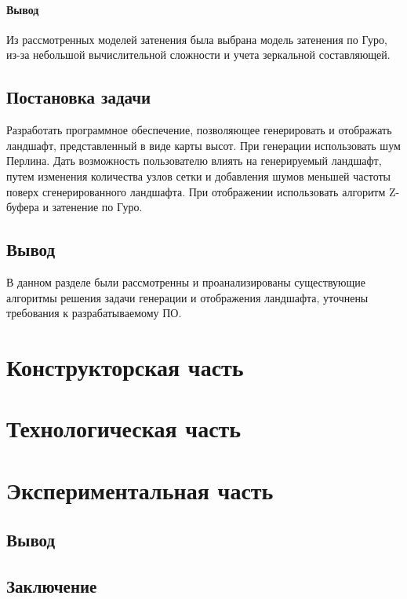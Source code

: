 \documentclass{article}
\begin{document}
	\paragraph{Вывод}
	\indent Из рассмотренных моделей затенения была выбрана модель затенения по Гуро, из-за небольшой вычислительной сложности и учета зеркальной составляющей.

	\subsection{Постановка задачи}
	\indent Разработать программное обеспечение, позволяющее генерировать и отображать ландшафт, представленный в виде карты высот. При генерации использовать шум Перлина. Дать возможность пользователю влиять на генерируемый ландшафт, путем изменения количества узлов сетки и добавления шумов меньшей частоты поверх сгенерированного ландшафта. При отображении использовать алгоритм Z-буфера и затенение по Гуро.
	\subsection{Вывод}
	\indent В данном разделе были рассмотренны и проанализированы существующие алгоритмы решения задачи генерации и отображения ландшафта, уточнены требования к разрабатываемому ПО.
	\newpage
	\section{Конструкторская часть}
	
	\newpage
	\section{Технологическая часть}
	

	\newpage
	\section{Экспериментальная часть}
	
	\subsection{Вывод}

	\newpage
	\begin{center}
		\section*{Заключение}
	\end{center}
	\newpage
	
\end{document}
